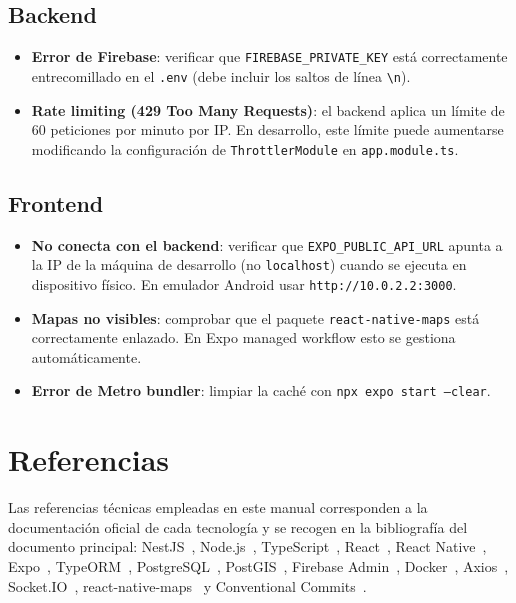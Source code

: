 \subsection{Backend}

\begin{itemize}
    \item \textbf{Error de Firebase}: verificar que \texttt{FIREBASE\_PRIVATE\_KEY} está correctamente entrecomillado en el \texttt{.env} (debe incluir los saltos de línea \texttt{\textbackslash n}).
    \item \textbf{Rate limiting (429 Too Many Requests)}: el backend aplica un límite de 60 peticiones por minuto por IP. En desarrollo, este límite puede aumentarse modificando la configuración de \texttt{ThrottlerModule} en \texttt{app.module.ts}.
\end{itemize}

\subsection{Frontend}

\begin{itemize}
    \item \textbf{No conecta con el backend}: verificar que \texttt{EXPO\_PUBLIC\_API\_URL} apunta a la IP de la máquina de desarrollo (no \texttt{localhost}) cuando se ejecuta en dispositivo físico. En emulador Android usar \texttt{http://10.0.2.2:3000}.
    \item \textbf{Mapas no visibles}: comprobar que el paquete \texttt{react-native-maps} está correctamente enlazado. En Expo managed workflow esto se gestiona automáticamente.
    \item \textbf{Error de Metro bundler}: limpiar la caché con \texttt{npx expo start --clear}.
\end{itemize}

\section{Referencias}

Las referencias técnicas empleadas en este manual corresponden a la documentación oficial de cada tecnología y se recogen en la bibliografía del documento principal: NestJS~\cite{nestjs,nestjsdocs}, Node.js~\cite{nodejs}, TypeScript~\cite{typescript}, React~\cite{react}, React Native~\cite{reactnative}, Expo~\cite{expo}, TypeORM~\cite{typeorm}, PostgreSQL~\cite{postgresql15}, PostGIS~\cite{postgisdocs}, Firebase Admin~\cite{firebaseadmin}, Docker~\cite{docker}, Axios~\cite{axios}, Socket.IO~\cite{socketio}, react-native-maps~\cite{reactnativemaps} y Conventional Commits~\cite{conventionalcommits}.
